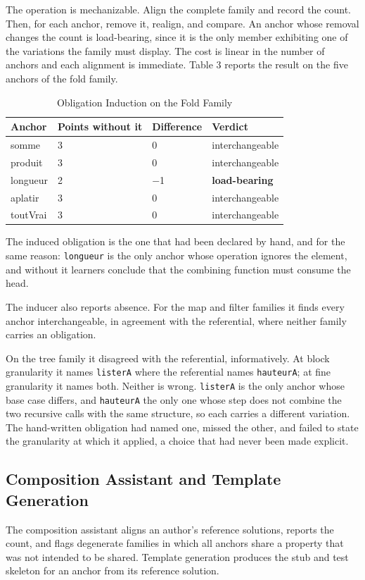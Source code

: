 \documentclass[10pt,twocolumn,letterpaper]{article}
\begin{document}
The operation is mechanizable. Align the complete family and record the count. Then, for each anchor, remove it, realign, and compare. An anchor whose removal changes the count is load-bearing, since it is the only member exhibiting one of the variations the family must display. The cost is linear in the number of anchors and each alignment is immediate. Table 3 reports the result on the five anchors of the fold family.

\begin{table}[t]
\centering\scriptsize
\caption{Obligation Induction on the Fold Family}
\begin{tabular}{@{}p{1.07in}p{2.28in}p{1.34in}p{2.01in}@{}}
\toprule
Anchor & Points without it & Difference & Verdict \\
\midrule
somme & 3 & 0 & interchangeable \\
produit & 3 & 0 & interchangeable \\
longueur & 2 & $-$1 & \textbf{load-bearing} \\
aplatir & 3 & 0 & interchangeable \\
toutVrai & 3 & 0 & interchangeable \\
\bottomrule
\end{tabular}
\end{table}

The induced obligation is the one that had been declared by hand, and
for the same reason: \texttt{longueur} is the only anchor whose
operation ignores the element, and without it learners conclude that the
combining function must consume the head.

The inducer also reports absence. For the map and filter
families it finds every anchor interchangeable, in agreement with the
referential, where neither family carries an obligation.

On the tree family it disagreed with the referential, informatively. At
block granularity it names \texttt{listerA} where the referential names
\texttt{hauteurA}; at fine granularity it names both. Neither is wrong.
\texttt{listerA} is the only anchor whose base case differs, and
\texttt{hauteurA} the only one whose step does not combine the two
recursive calls with the same structure, so each carries a different
variation. The hand-written obligation had named one, missed the other,
and failed to state the granularity at which it applied, a choice that
had never been made explicit.

\subsection{Composition Assistant and Template Generation}
The composition assistant aligns an author's reference solutions,
reports the count, and flags degenerate families in which all anchors
share a property that was not intended to be shared. Template generation
produces the stub and test skeleton for an anchor from its reference
solution.
\end{document}
